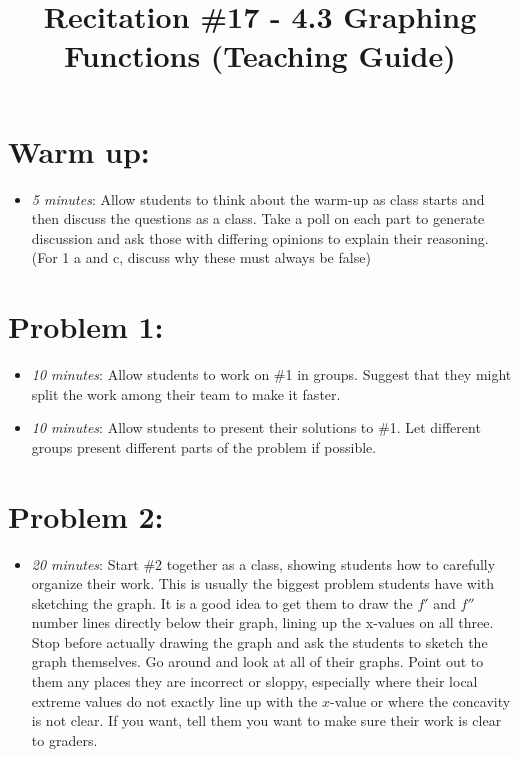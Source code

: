 \documentclass[handout,nooutcomes]{ximera}
\title{Recitation \#17 - 4.3 Graphing Functions (Teaching Guide)}
\begin{document}
\begin{abstract}		\end{abstract}
\maketitle


\section*{Warm up:} 
	
	\begin{itemize}
	
	\item  \emph{5 minutes}:  Allow students to think about the warm-up as class starts and then discuss the questions as a class. Take a poll on each part to generate discussion and ask those with differing opinions to explain their reasoning. (For 1 a and c, discuss why these must always be false)
	
	\end{itemize}


\section*{Problem 1:}

	\begin{itemize}
	
	\item  \emph{10 minutes}:  Allow students to work on \#1 in groups. Suggest that they might split the work among their team to make it faster.  
	
	\item  \emph{10 minutes}:  Allow students to present their solutions to \#1.  Let different groups present different parts of the problem if possible.
	
	\end{itemize}
	
	
	
\section*{Problem 2:}

	\begin{itemize}
	
	\item  \emph{20 minutes}:  Start \#2 together as a class, showing students how to carefully organize their work.  This is usually the biggest problem students have with sketching the graph.  It is a good idea to get them to draw the $f'$ and $f''$ number lines directly below their graph, lining up the x-values on all three.  Stop before actually drawing the graph and ask the students to sketch the graph themselves.  Go around and look at all of their graphs.  Point out to them any places they are incorrect or sloppy, especially where their local extreme values do not exactly line up with the $x$-value or where the concavity is not clear.  If you want, tell them you want to make sure their work is clear to graders.  
	
	\end{itemize}
	
\end{document}
